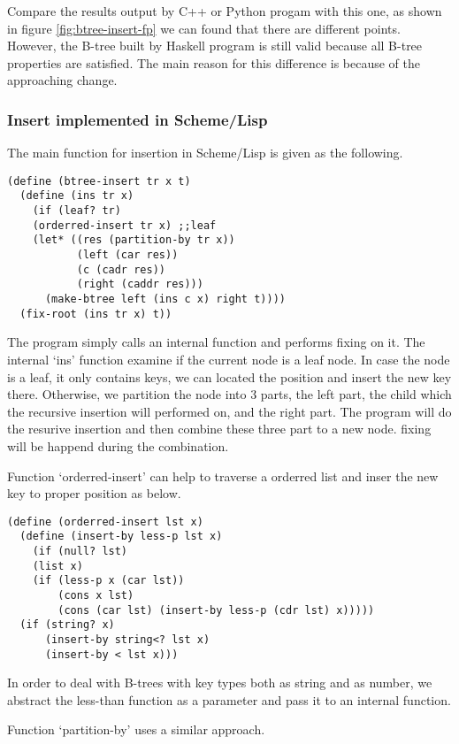 \documentclass{article}
\begin{document}
Compare the results output by C++ or Python progam with this one,
as shown in figure \ref{fig:btree-insert-fp}
we can found that there are different points. However, the B-tree
built by Haskell program is still valid because all B-tree properties
are satisfied. The main reason for this difference is because of
the approaching change.

\subsubsection*{Insert implemented in Scheme/Lisp}
The main function for insertion in Scheme/Lisp is given as the 
following.

\lstset{language=lisp}
\begin{lstlisting}
(define (btree-insert tr x t)
  (define (ins tr x)
    (if (leaf? tr)
	(orderred-insert tr x) ;;leaf
	(let* ((res (partition-by tr x))
	       (left (car res))
	       (c (cadr res))
	       (right (caddr res)))
	  (make-btree left (ins c x) right t))))
  (fix-root (ins tr x) t))
\end{lstlisting}

The program simply calls an internal function and performs fixing
on it. The internal `ins' function examine if the current node
is a leaf node. In case the node is a leaf, it only contains keys,
we can located the position and insert the new key there. Otherwise,
we partition the node into 3 parts, the left part, the child which
the recursive insertion will performed on, and the right part.
The program will do the resurive insertion and then combine 
these three part to a new node. fixing will be happend during the
combination.

Function `orderred-insert' can help to traverse a orderred list
and inser the new key to proper position as below.

\begin{lstlisting}
(define (orderred-insert lst x)
  (define (insert-by less-p lst x)
    (if (null? lst)
	(list x)
	(if (less-p x (car lst))
	    (cons x lst)
	    (cons (car lst) (insert-by less-p (cdr lst) x)))))
  (if (string? x)
      (insert-by string<? lst x)
      (insert-by < lst x)))
\end{lstlisting}

In order to deal with B-trees with key types both as string and
as number, we abstract the less-than function as a parameter
and pass it to an internal function.

Function `partition-by' uses a similar approach.
\end{document}
